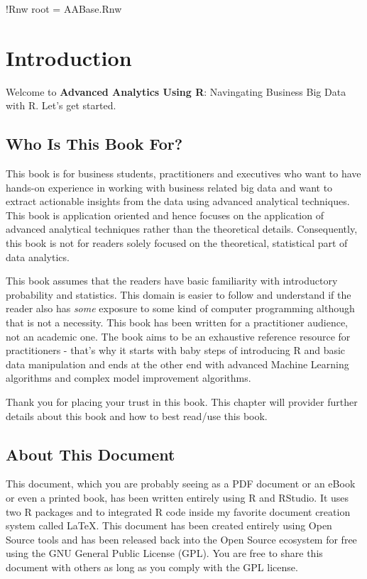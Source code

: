  !Rnw root = AABase.Rnw

\chapter*{Introduction}

Welcome to \textbf{Advanced Analytics Using R}: Navingating Business Big Data with R. Let's get started.

\section*{Who Is This Book For?}

This book is for business students, practitioners and executives who want to have hands-on experience in working with business related big data and want to extract actionable insights from the data using advanced analytical techniques. This book is application oriented and hence focuses on the application of advanced analytical techniques rather than the theoretical details. Consequently, this book is not for readers solely focused on the theoretical, statistical part of data analytics. 

This book assumes that the readers have basic familiarity with introductory probability and statistics. This domain is easier to follow and understand if the reader also has \textit{some} exposure to some kind of computer programming although that is not a necessity. This book has been written for a practitioner audience, not an academic one. The book aims to be an exhaustive reference resource for practitioners - that's why it starts with baby steps of introducing R and basic data manipulation and ends at the other end with advanced Machine Learning algorithms and complex model improvement algorithms.

Thank you for placing your trust in this book. This chapter will provider further details about this book and how to best read/use this book.

\section*{About This Document}

This document, which you are probably seeing as a PDF document or an eBook or even a printed book, has been written entirely using R and RStudio. It uses two R packages  and  to integrated R code inside my favorite document creation system called \LaTeX. This document has been created entirely using Open Source tools and has been released back into the Open Source ecosystem for free using the GNU General Public License (GPL). You are free to share this document with others as long as you comply with the GPL license. 

